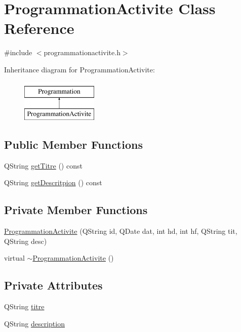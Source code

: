 \hypertarget{class_programmation_activite}{}\section{Programmation\+Activite Class Reference}
\label{class_programmation_activite}


{\ttfamily \#include $<$programmationactivite.\+h$>$}

Inheritance diagram for Programmation\+Activite\+:\begin{figure}[H]
\begin{center}
\leavevmode
\includegraphics[height=2.000000cm]{class_programmation_activite}
\end{center}
\end{figure}
\subsection*{Public Member Functions}
\begin{DoxyCompactItemize}
\item 
Q\+String \hyperlink{class_programmation_activite_a8a29a5c0e39ad57aaf2ed73c8a004d3c}{get\+Titre} () const 
\item 
Q\+String \hyperlink{class_programmation_activite_a91de19dc76479adeddac07b5a259c026}{get\+Descritpion} () const 
\end{DoxyCompactItemize}
\subsection*{Private Member Functions}
\begin{DoxyCompactItemize}
\item 
\hyperlink{class_programmation_activite_a2492901bfd220779a942fabade7486d1}{Programmation\+Activite} (Q\+String id, Q\+Date dat, int hd, int hf, Q\+String tit, Q\+String desc)
\item 
virtual \hyperlink{class_programmation_activite_acd35d754d36b98a94b5b846378100c33}{$\sim$\+Programmation\+Activite} ()
\end{DoxyCompactItemize}
\subsection*{Private Attributes}
\begin{DoxyCompactItemize}
\item 
Q\+String \hyperlink{class_programmation_activite_aa6f6ff264184635b35615abb4e45ab62}{titre}
\item 
Q\+String \hyperlink{class_programmation_activite_ae2a01c5cfffda9813ae77c1b98c7a52b}{description}
\end{DoxyCompactItemize}
